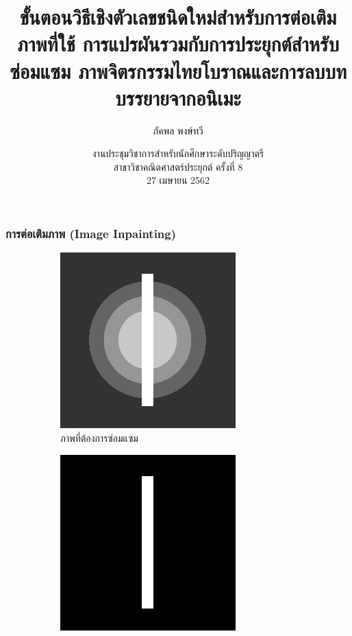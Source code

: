 \documentclass[xcolor=dvipsnames, xetex,serif]{beamer}
\title[วิธีเชิงตัวเลขสำหรับต่อเติมภาพ]{ขั้นตอนวิธีเชิงตัวเลขชนิดใหม่สำหรับการต่อเติมภาพที่ใช้ \break การแปรผันรวมกับการประยุกต์สำหรับซ่อมแซม \break ภาพจิตรกรรมไทยโบราณและการลบบทบรรยายจากอนิเมะ}
\author[ภัคพล]{ภัคพล พงษ์ทวี}
\institute[ม. ศิลปากร]{
 	ภาควิชาคณิตศาสตร์\\
 	มหาวิทยาลัยศิลปากร \\}
\date[UAMC 2019]{งานประชุมวิชาการสำหรับนักศึกษาระดับปริญญาตรี\\ สาขาวิชาคณิตศาสตร์ประยุกต์ ครั้งที่ 8\\27 เมษายน 2562}
\numberwithin{equation}{section}
\begin{document}
    \begin{frame}
        \titlepage 
    \end{frame}
    \begin{frame}
        \frametitle{การต่อเติมภาพ (Image Inpainting)} 
        \begin{figure}[H]
            \centering
            \begin{subfigure}{0.3\linewidth}
                \centering
                \includegraphics[width=0.8\linewidth]{images/grayscale_inpaint/toinpaint.png}
                \caption{ภาพที่ต้องการซ่อมแซม}
            \end{subfigure}
            \begin{subfigure}{0.3\linewidth}
                \centering
                \includegraphics[width=0.8\linewidth]{images/grayscale_inpaint/inpaintdomain.png}

\end{subfigure}
\end{figure}
\end{frame}
\end{document}
